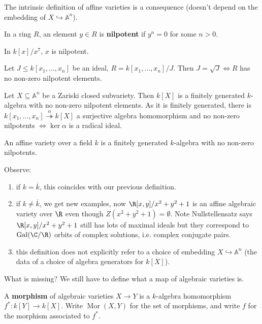 \documentclass{article}
\newcommand{\A}{\mathbb{A}}
\DeclareMathOperator{\Mor}{Mor}
\DeclareMathOperator{\Gal}{Gal}
\begin{document}
The intrinsic definition of affine varieties is a consequence (doesn't depend on the embedding of $X \hookrightarrow \A^n$).
\begin{defi}[Nilpotent]
    In a ring $R$, an element $y \in R$ is \textbf{nilpotent} if $y^n = 0$ for some $n > 0$.
\end{defi}
\begin{eg}
    In $k[x]/x^7$, $x$ is nilpotent.
\end{eg}
\color{gray}
\begin{ex}
    Let $J \leq k[x_1, \dotsc, x_n]$ be an ideal, $R = k[x_1, \dotsc, x_n]/J$. Then $J = \sqrt{J} \iff R$ has no non-zero nilpotent elements.
\end{ex}
\begin{cor}
    Let $X \subseteq \A^n$ be a Zariski closed subvariety.
    Then $k[X]$ is a finitely generated $k$-algebra with no non-zero nilpotent elements.
    As it is finitely generated, there is $k[x_1, \dotsc, x_n] \overset{\alpha}{\twoheadrightarrow}k[X]$ a surjective algebra homomorphism and no non-zero nilpotents $\iff \ker \alpha$ is a radical ideal.
\end{cor}
\begin{defi}
    An affine variety over a field $k$ is a finitely generated $k$-algebra with no non-zero nilpotents.
\end{defi}
Observe:
\begin{enumerate}[label=(\roman*)]
    \item if $k = \overline{k}$, this coincides with our previous definition.
    \item if $k \neq \overline{k}$, we get new examples, now $\R[x,y]/x^2 + y^2 + 1$ is an affine algebraic variety over $\R$ even though $Z(x^2 + y^2 + 1) = \emptyset$.
        Note Nullstellensatz says $\R[x,y]/x^2 + y^2 + 1$ still has lots of maximal ideals but they correspond to $\Gal(\C/\R)$ orbits of complex solutions, i.e. complex conjugate pairs.
    \item this definition does not explicitly refer to a choice of embedding $X \hookrightarrow \A^n$ (the data of a choice of algebra generators for $k[X]$).
\end{enumerate}
What is missing? We still have to define what a map of algebraic varieties is.
\begin{defi}[Morphism]
    A \textbf{morphism} of algebraic varieties $X \to Y$ is a $k$-algebra homomorphism $f^*: k[Y] \to k[X]$. Write $\Mor(X, Y)$ for the set of morphisms, and write $f$ for the morphism associated to $f^*$.
\end{defi}
\end{document}
